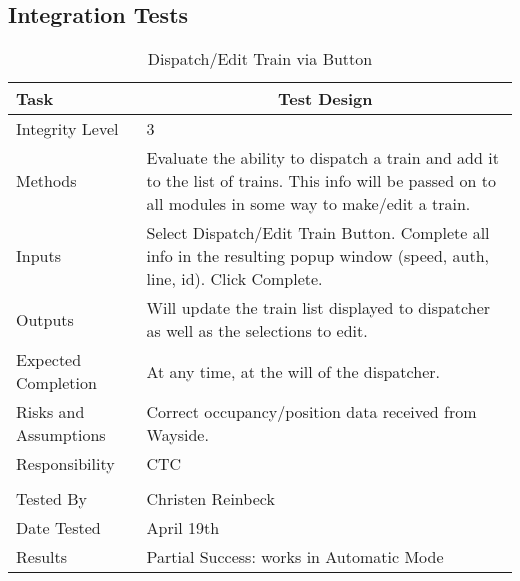 \documentclass[]{article}
\begin{document}
\subsection{Integration Tests}

 
\begin{table}[H]
	\centering
	\caption{Dispatch/Edit Train via Button}
	\begin{tabular}{|l|l|}
		\hline
		Task & \multicolumn{1}{c|}{Test Design} \\ \hline
		Integrity Level & 3 \\ \hline
		Methods & \parbox[t]{10cm}{Evaluate the ability to dispatch a train and add it to the list of trains. This info will be passed on to all modules in some way to make/edit a train.}\\ \hline
		Inputs &  \parbox[t]{10cm}{Select Dispatch/Edit Train Button. Complete all info in the resulting popup window (speed, auth, line, id). Click Complete.} \\ \hline
		Outputs &  \parbox[t]{10cm}{Will update the train list displayed to dispatcher as well as the selections to edit.} \\ \hline
		Expected Completion & At any time, at the will of the dispatcher. \\ \hline
		Risks and Assumptions & \parbox[t]{10cm}{Correct occupancy/position data received from Wayside.}  \\ \hline
		Responsibility & CTC\\ \hline
		\\ \hline
		Tested By   &  Christen Reinbeck\\	\hline
		Date Tested & \parbox[t]{10cm}{April 19th}\\ \hline
		Results & Partial Success: works in Automatic Mode \\ \hline
	\end{tabular}
\end{table}
\end{document}
